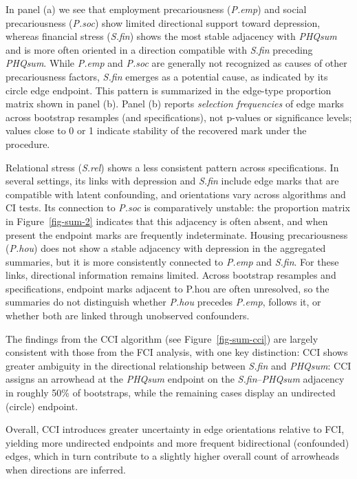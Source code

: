 \documentclass[
]{article}
\begin{document}
\textcolor{BrickRed}{In panel (a) we see that employment precariousness (\textit{P.emp}) and social precariousness (\textit{P.soc}) show limited directional support toward depression, whereas financial stress (\textit{S.fin}) shows the most stable adjacency with \textit{PHQsum} and is more often oriented in a direction compatible with \textit{S.fin} preceding \textit{PHQsum}.}
While \emph{P.emp} and \emph{P.soc} are generally not recognized as
causes of other precariousness factors, \emph{S.fin} emerges as a
potential cause, as indicated by its circle edge endpoint.
\textcolor{BrickRed}{This pattern is summarized in the edge-type proportion matrix shown in panel (b). Panel (b) reports \emph{selection frequencies} of edge marks across bootstrap resamples (and specifications), not p-values or significance levels; values close to 0 or 1 indicate stability of the recovered mark under the procedure.}

\textcolor{BrickRed}{Relational stress (\textit{S.rel}) shows a less consistent pattern across specifications. In several settings, its links with depression and \textit{S.fin} include edge marks that are compatible with latent confounding, and orientations vary across algorithms and CI tests. Its connection to \textit{P.soc} is comparatively unstable: the proportion matrix in}
Figure~\ref{fig-sum-2}
\textcolor{BrickRed}{indicates that this adjacency is often absent, and when present the endpoint marks are frequently indeterminate. Housing precariousness (\textit{P.hou}) does not show a stable adjacency with depression in the aggregated summaries, but it is more consistently connected to \textit{P.emp} and \textit{S.fin}. For these links, directional information remains limited. Across bootstrap resamples and specifications, endpoint marks adjacent to P.hou are often unresolved, so the summaries do not distinguish whether \textit{P.hou} precedes \textit{P.emp}, follows it, or whether both are linked through unobserved confounders.}

The findings from the CCI algorithm (see Figure~\ref{fig-sum-cci}) are
largely consistent with those from the FCI analysis, with one key
distinction: CCI shows greater ambiguity in the directional relationship
between \emph{S.fin} and \emph{PHQsum}:
\textcolor{BrickRed}{CCI assigns an arrowhead at the \textit{PHQsum} endpoint on the \textit{S.fin}–\textit{PHQsum} adjacency in roughly 50\% of bootstraps, while the remaining cases display an undirected (circle) endpoint.}

Overall, CCI introduces greater uncertainty in edge orientations
relative to FCI, yielding more undirected endpoints and more frequent
bidirectional (confounded) edges, which in turn contribute to a slightly
higher overall count of arrowheads when directions are inferred.
\end{document}
